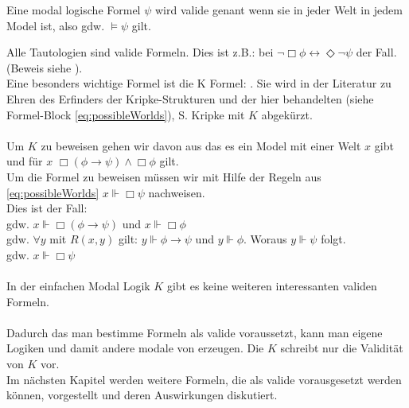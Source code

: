 \begin{definition}
	\label{def:valide}
	Eine modal logische Formel $\psi$ wird valide genant wenn sie in jeder Welt in jedem Model \true ist, also gdw. $\vDash \psi$ gilt.
\end{definition}
\cite[S.314]{huth2004logic}
%
Alle Tautologien sind valide Formeln.
Dies ist z.B.: bei $\neg \Box \phi \leftrightarrow \Diamond \neg \psi$ der Fall.
(Beweis siehe \cite[S.314]{huth2004logic}).\\
Eine besonders wichtige Formel ist die K Formel: \KFormel .
Sie wird in der Literatur zu Ehren des Erfinders der Kripke-Strukturen und der hier behandelten  (siehe Formel-Block \eqref{eq:possibleWorlds}), S. Kripke mit $K$ abgekürzt.\\
\\
Um $K$ zu beweisen gehen wir davon aus das es ein Model \modelFormel mit einer Welt $x$ gibt und für $x$ $\Box(\phi \rightarrow \psi) \wedge \Box \phi$ gilt.\\
Um die Formel zu beweisen müssen wir mit Hilfe der Regeln aus \eqref{eq:possibleWorlds} $x \Vdash \Box \psi$ nachweisen.\\
Dies ist der Fall:\\
gdw. $x \Vdash \Box(\phi \rightarrow \psi)$ und $x \Vdash \Box \phi$\\
gdw. $\forall y$ mit $R(x,y)$ gilt: $y \Vdash \phi \rightarrow \psi$ und $y \Vdash \phi$. Woraus $y \Vdash \psi$ folgt.\\
gdw. $x \Vdash \Box \psi$\\
\\
In der einfachen Modal Logik $K$ gibt es keine weiteren interessanten validen Formeln.\cite[S.314]{huth2004logic}\\
\\
Dadurch das man bestimme Formeln als valide voraussetzt, kann man eigene Logiken und damit andere modale von \true erzeugen.
Die \NML $K$ schreibt nur die Validität von $K$ vor.\\
Im nächsten Kapitel werden weitere Formeln, die als valide vorausgesetzt werden können, vorgestellt und deren Auswirkungen diskutiert.









